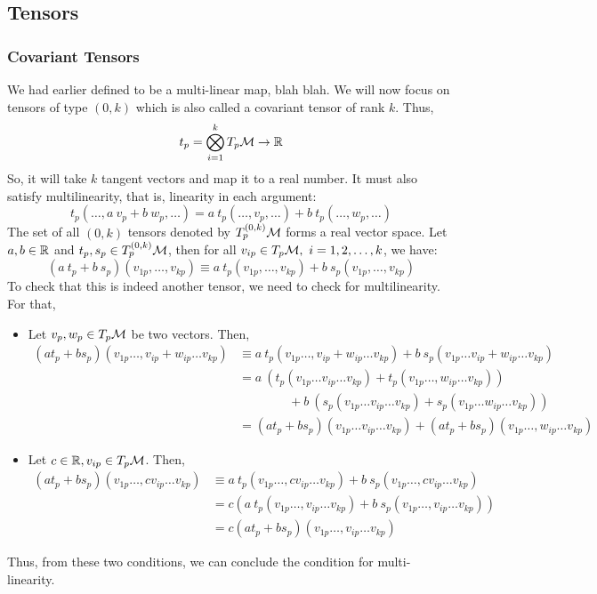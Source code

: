 \subsection{Tensors}
\subsubsection{Covariant Tensors}
We had earlier defined to be a multi-linear map, blah blah. We will now focus on tensors of type $(0,k)$ which is also called a covariant tensor of rank $k$. Thus,
$$t_p = \bigotimes_{i=1}^k T_p\mathcal M\rightarrow \mathbb{R}$$
So, it will take $k$ tangent vectors and map it to a real number. It must also satisfy multilinearity, that is, linearity in each argument:
$$t_p(\ldots, a\ v_p + b\ w_p,\ldots ) = a \ t_p(\ldots,v_p,\ldots ) + b\ t_p(\ldots,w_p,\ldots ) $$
The set of all $(0,k)$ tensors denoted by $T_p^{(0,k)}\mathcal M$ forms a real vector space. Let $a,b\in \mathbb{R}$ and $t_p, s_p\in T_p^{(0,k)}\mathcal M$, then for all $v_{ip}\in T_p\mathcal M, \ i=1,2,\ldots,k$, we have:
$$(a\ t_p+b\ s_p)(v_{1p}, \ldots, v_{kp})\equiv a\ t_p(v_{1p}, \ldots, v_{kp})+b\ s_p(v_{1p}, \ldots, v_{kp})$$ 
To check that this is indeed another tensor, we need to check for multilinearity. For that,
\begin{itemize}
    \item Let $v_p, w_p\in T_p\mathcal M$ be two vectors. Then,
    \begin{align*}
        (a t_p+b s_p)(v_{1p} \ldots, v_{ip} + w_{ip}\ldots v_{kp})&\equiv a\ t_p(v_{1p}\ldots, v_{ip} + w_{ip} \ldots v_{kp})+b\ s_p(v_{1p} \ldots v_{ip} + w_{ip} \ldots v_{kp})\\
        &=a\ (t_p(v_{1p}\ldots v_{ip} \ldots v_{kp})+t_p(v_{1p}\ldots, w_{ip} \ldots v_{kp}))\\&\qquad \qquad+b\ (s_p(v_{1p} \ldots v_{ip} \ldots v_{kp})+s_p(v_{1p} \ldots w_{ip} \ldots v_{kp}))\\
        &=(a t_p + b s_p) (v_{1p}\ldots v_{ip} \ldots v_{kp}) + (a t_p + b s_p) (v_{1p}\ldots, w_{ip} \ldots v_{kp})
    \end{align*}
\item Let $c\in \mathbb{R}, v_{ip}\in T_p\mathcal M$. Then,
\begin{align*}
    (a t_p+b s_p)(v_{1p} \ldots, cv_{ip}\ldots v_{kp})&\equiv a\ t_p(v_{1p}\ldots, c v_{ip} \ldots v_{kp})+b\ s_p(v_{1p}\ldots, c v_{ip} \ldots v_{kp})\\ &= c(a\ t_p(v_{1p}\ldots,v_{ip} \ldots v_{kp})+b\ s_p(v_{1p}\ldots,v_{ip} \ldots v_{kp}))\\
    &=c (at_p+bs_p)(v_{1p}\ldots,v_{ip} \ldots v_{kp})
\end{align*}
\end{itemize}
Thus, from these two conditions, we can conclude the condition for multi-linearity. 
